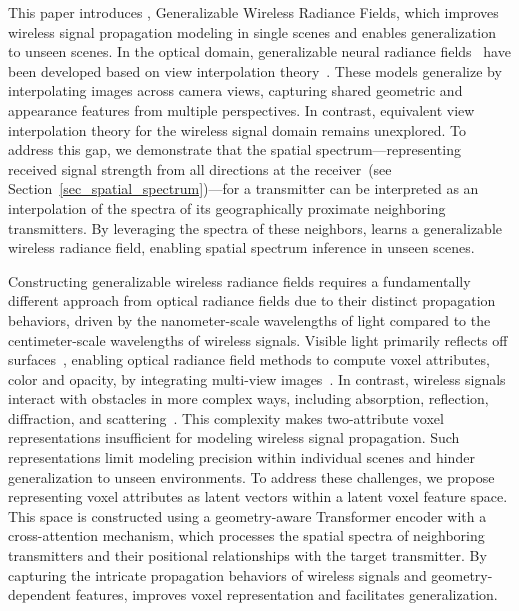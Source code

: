 This paper introduces \ourSystem, Generalizable Wireless Radiance Fields, which improves wireless signal propagation modeling in single scenes and enables generalization to unseen scenes.
In the optical domain, generalizable neural radiance fields~\cite{chen2021mvsnerf, trevithick2020grf, wang2021ibrnet, liu2022neural} have been developed based on view interpolation theory~\cite{chen2023view}. 
These models generalize by interpolating images across camera views, capturing shared geometric and appearance features from multiple perspectives.
In contrast, equivalent view interpolation theory for the wireless signal domain remains unexplored. 
To address this gap, we demonstrate that the spatial spectrum—representing received signal strength from all directions at the receiver~(see Section~\ref{sec_spatial_spectrum})—for a transmitter can be interpreted as an interpolation of the spectra of its geographically proximate neighboring transmitters. 
By leveraging the spectra of these neighbors, \ourSystem learns a generalizable wireless radiance field, enabling spatial spectrum inference in unseen scenes.


Constructing generalizable wireless radiance fields requires a fundamentally different approach from optical radiance fields due to their distinct propagation behaviors, driven by the nanometer-scale wavelengths of light compared to the centimeter-scale wavelengths of wireless signals.
Visible light primarily reflects off surfaces~\cite{pathak2015visible}, enabling optical radiance field methods to compute voxel attributes, \ie color and opacity, by integrating multi-view images~\cite{chen2021mvsnerf, trevithick2020grf}. 
In contrast, wireless signals interact with obstacles in more complex ways, including absorption, reflection, diffraction, and scattering~\cite{1451581, na2022huygens}.
This complexity makes two-attribute voxel representations insufficient for modeling wireless signal propagation. 
Such representations limit modeling precision within individual scenes and hinder generalization to unseen environments.
To address these challenges, we propose representing voxel attributes as latent vectors within a latent voxel feature space. 
This space is constructed using a geometry-aware Transformer encoder with a cross-attention mechanism, which processes the spatial spectra of neighboring transmitters and their positional relationships with the target transmitter. 
By capturing the intricate propagation behaviors of wireless signals and geometry-dependent features, \ourSystem improves voxel representation and facilitates generalization.



